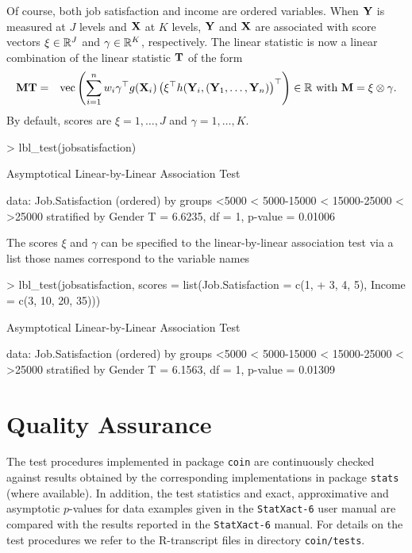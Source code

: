 \documentclass[letter]{article}
\begin{document}
Of course, both job satisfaction and income are ordered variables. 
When $\mathbf{Y}$ is measured at $J$ levels and $\mathbf{X}$ at $K$ levels, 
$\mathbf{Y}$ and $\mathbf{X}$ are associated with score vectors $\xi \in
\mathbb{R}^J$ and $\gamma \in \mathbb{R}^K$, respectively. The linear statistic is now a linear
combination of the linear statistic $\mathbf{T}$ of the form
\begin{eqnarray*}
\mathbf{M} \mathbf{T} & = & \text{vec} \left( \sum_{i=1}^n w_i \gamma^\top g(\mathbf{X}_i)
            \left(\xi^\top h(\mathbf{Y}_i, (\mathbf{Y}_1, \dots, \mathbf{Y}_n)\right)^\top \right)
\in \mathbb{R} \text{ with } \mathbf{M} = \xi \otimes \gamma.
\end{eqnarray*}
By default, scores are $\xi = 1, \dots, J$ and $\gamma = 1, \dots, K$.
\begin{Schunk}
\begin{Sinput}
> lbl_test(jobsatisfaction)
\end{Sinput}
\begin{Soutput}
	Asymptotical Linear-by-Linear Association Test

data:  Job.Satisfaction (ordered) by
	 groups <5000 < 5000-15000 < 15000-25000 < >25000 
	 stratified by Gender 
T = 6.6235, df = 1, p-value = 0.01006
\end{Soutput}
\end{Schunk}
The scores $\xi$ and $\gamma$ can be specified to the linear-by-linear
association test via a list those names correspond to the variable names
\begin{Schunk}
\begin{Sinput}
> lbl_test(jobsatisfaction, scores = list(Job.Satisfaction = c(1, 
+     3, 4, 5), Income = c(3, 10, 20, 35)))
\end{Sinput}
\begin{Soutput}
	Asymptotical Linear-by-Linear Association Test

data:  Job.Satisfaction (ordered) by
	 groups <5000 < 5000-15000 < 15000-25000 < >25000 
	 stratified by Gender 
T = 6.1563, df = 1, p-value = 0.01309
\end{Soutput}
\end{Schunk}

\section{Quality Assurance}

The test procedures implemented in package \texttt{coin} are continuously checked
against results obtained by the corresponding implementations in package
\texttt{stats} (where available). In addition, the test statistics and 
exact, approximative and asymptotic $p$-values for data examples given in the 
\texttt{StatXact-6} 
user manual \citep{StatXact6} are compared with the results reported in the
\texttt{StatXact-6} manual. For details on the test procedures we refer to
the \textsf{R}-transcript files in directory \texttt{coin/tests}.




\end{document}
